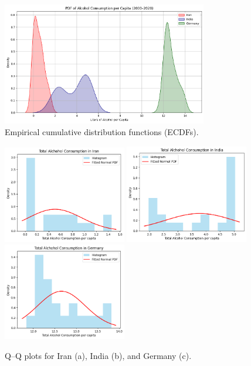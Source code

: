 \documentclass[12pt,a4paper]{article}
\begin{document}
	\begin{figure}[ht]
		\centering
		\includegraphics[width=0.8\textwidth]{figure-3.png}
		\caption{Empirical cumulative distribution functions (ECDFs).}
		\label{fig:ecdf}
	\end{figure}
	
	\begin{figure}[ht]
		\centering
		\includegraphics[width=0.48\textwidth]{figure-4a.png}
		\includegraphics[width=0.48\textwidth]{figure-4b.png}
		\includegraphics[width=0.48\textwidth]{figure-4c.png}
		\caption{Q--Q plots for Iran (a), India (b), and Germany (c).}
		\label{fig:qqplots}
	\end{figure}
	
\end{document}
